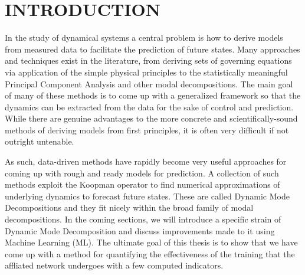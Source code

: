 %

\chapter{INTRODUCTION}
\label{chap:intro}

In the study of dynamical systems a central problem is how to derive models 
from measured data to facilitate the prediction of future states. Many 
approaches and techniques exist in the literature, from deriving sets of 
governing equations via application of the simple physical principles to 
the statistically meaningful Principal Component Analysis and other modal 
decompositions. The main goal of many of these methods is to come up with 
a generalized framework so that the dynamics can be extracted from the data
for the sake of control and prediction. While there are genuine advantages
to the more concrete and scientifically-sound methods of deriving models 
from first principles, it is often very difficult if not outright untenable.

As such, data-driven methods have rapidly become very useful approaches for 
coming up with rough and ready models for prediction. A collection of such
methods exploit the Koopman operator to find numerical approximations of 
underlying dynamics to forecast future states. These are called Dynamic Mode 
Decompositions and they fit nicely within the broad family of modal 
decompositions. In the coming sections, we will introduce a specific strain
of Dynamic Mode Decomposition and discuss improvements made to it using
Machine Learning (ML). The ultimate goal of this thesis is to show that we have
come up with a method for quantifying the effectiveness of the training 
that the affliated network undergoes with a few computed indicators.


